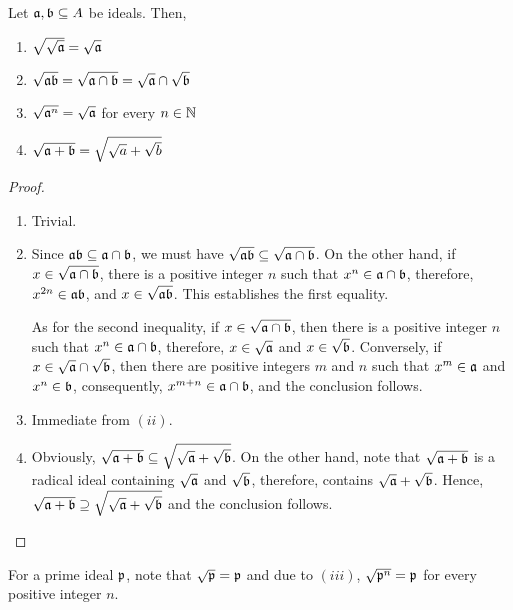 \begin{proposition}
    Let $\mathfrak a,\mathfrak b\subseteq A$ be ideals. Then, 
    \begin{enumerate}[label=(\roman*)]
        \item $\sqrt{\sqrt{\mathfrak a}} = \sqrt{\mathfrak a}$
        \item $\sqrt{\mathfrak a\mathfrak b} = \sqrt{\mathfrak a\cap\mathfrak b} = \sqrt{\mathfrak a}\cap\sqrt{\mathfrak b}$
        \item $\sqrt{\mathfrak a^n} = \sqrt{\mathfrak a}$ for every $n\in\mathbb{N}$
        \item $\sqrt{\mathfrak a + \mathfrak b} = \sqrt{\sqrt{a} + \sqrt{b}}$
    \end{enumerate}
\end{proposition}
\begin{proof}
\begin{enumerate}[label=(\roman*)]
    \item Trivial.
    \item Since $\mathfrak a\mathfrak b\subseteq\mathfrak a\cap\mathfrak b$, we must have $\sqrt{\mathfrak a\mathfrak b}\subseteq\sqrt{\mathfrak a\cap\mathfrak b}$. On the other hand, if $x\in\sqrt{\mathfrak a\cap\mathfrak b}$, there is a positive integer $n$ such that $x^n\in\mathfrak a\cap\mathfrak b$, therefore, $x^{2n}\in\mathfrak a\mathfrak b$, and $x\in\sqrt{\mathfrak a\mathfrak b}$. This establishes the first equality.

    As for the second inequality, if $x\in\sqrt{\mathfrak a\cap\mathfrak b}$, then there is a positive integer $n$ such that $x^n\in\mathfrak a\cap\mathfrak b$, therefore, $x\in\sqrt{\mathfrak a}$ and $x\in\sqrt{\mathfrak b}$. Conversely, if $x\in\sqrt{\mathfrak a}\cap\sqrt{\mathfrak b}$, then there are positive integers $m$ and $n$ such that $x^m\in\mathfrak a$ and $x^n\in\mathfrak b$, consequently, $x^{m + n}\in\mathfrak a\cap\mathfrak b$, and the conclusion follows. 

    \item Immediate from $(ii)$.
    \item Obviously, $\sqrt{\mathfrak a + \mathfrak b}\subseteq\sqrt{\sqrt{\mathfrak a} + \sqrt{\mathfrak b}}$. On the other hand, note that $\sqrt{\mathfrak a + \mathfrak b}$ is a radical ideal containing $\sqrt{\mathfrak a}$ and $\sqrt{\mathfrak b}$, therefore, contains $\sqrt{\mathfrak a} + \sqrt{\mathfrak b}$. Hence, $\sqrt{\mathfrak a + \mathfrak b}\supseteq\sqrt{\sqrt{\mathfrak a} + \sqrt{\mathfrak b}}$ and the conclusion follows.
\end{enumerate}
\end{proof}

For a prime ideal $\mathfrak p$, note that $\sqrt{\mathfrak p} = \mathfrak p$ and due to $(iii)$, $\sqrt{\mathfrak p^n} = \mathfrak p$ for every positive integer $n$. 

